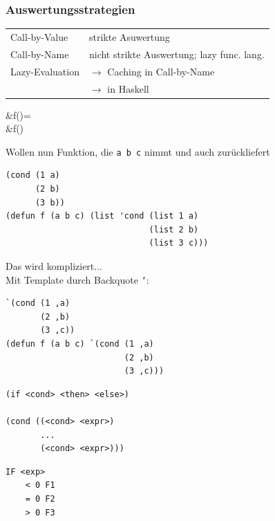 	\subsubsection*{Auswertungsstrategien} %
	\label{ssub:auswertungsstrategien}

		\begin{tabular}{ll}
		Call-by-Value	&	strikte Asuwertung	\\
		Call-by-Name	&	nicht strikte Auswertung; lazy func. lang.\\
		\rotatebox[origin=c]{180}{$\Lsh$} Lazy-Evaluation	& $\rightarrow$ Caching in Call-by-Name\\
		&	$\rightarrow$ in Haskell
		\end{tabular}

		\begin{flalign*}
			&f(\perp)=\perp\qquad\qquad{}\\
			&f(\perp)\neq\perp\qquad\qquad{}
		\end{flalign*}
	

	Wollen nun Funktion, die \texttt{a b c} nimmt und auch zurückliefert

	\lstLisp
	\begin{lstlisting}
(cond (1 a)
      (2 b)
      (3 b))
(defun f (a b c) (list 'cond (list 1 a)
                             (list 2 b)
                             (list 3 c)))
	\end{lstlisting}

	Das wird kompliziert...\\
	Mit Template durch Backquote \texttt{`}:

	\lstLisp
	\begin{lstlisting}
`(cond (1 ,a)
       (2 ,b)
       (3 ,c))
(defun f (a b c) `(cond (1 ,a)
                        (2 ,b)
                        (3 ,c)))
	\end{lstlisting}

	\lstLisp[Verzweigungen]
	\begin{lstlisting}
(if <cond> <then> <else>)

(cond ((<cond> <expr>)
       ...
       (<cond> <expr>)))
	\end{lstlisting}

	\begin{lstlisting}
IF <exp>
	< 0	F1
	= 0	F2
	> 0	F3
	\end{lstlisting}

